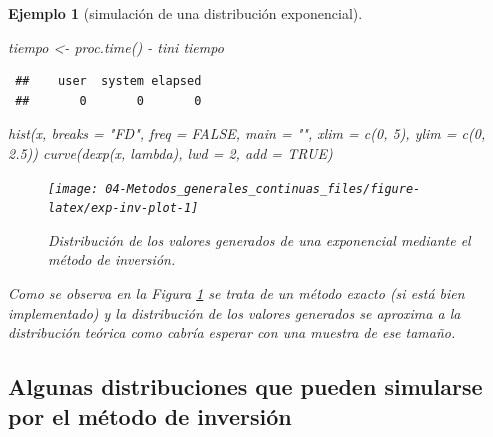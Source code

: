 \documentclass[
]{book}
\newenvironment{Shaded}{\begin{snugshade}}{\end{snugshade}}
\newcommand{\AttributeTok}[1]{\textcolor[rgb]{0.77,0.63,0.00}{#1}}
\newcommand{\ConstantTok}[1]{\textcolor[rgb]{0.00,0.00,0.00}{#1}}
\newcommand{\DecValTok}[1]{\textcolor[rgb]{0.00,0.00,0.81}{#1}}
\newcommand{\FloatTok}[1]{\textcolor[rgb]{0.00,0.00,0.81}{#1}}
\newcommand{\FunctionTok}[1]{\textcolor[rgb]{0.00,0.00,0.00}{#1}}
\newcommand{\NormalTok}[1]{#1}
\newcommand{\OtherTok}[1]{\textcolor[rgb]{0.56,0.35,0.01}{#1}}
\newcommand{\SpecialCharTok}[1]{\textcolor[rgb]{0.00,0.00,0.00}{#1}}
\newcommand{\StringTok}[1]{\textcolor[rgb]{0.31,0.60,0.02}{#1}}
\theoremstyle{break}
\newtheorem{example}{Ejemplo}[chapter]
\theoremstyle{nonumberplain}
\begin{document}
\begin{example}[simulación de una distribución exponencial]
\begin{Shaded}
\begin{Highlighting}[]
\NormalTok{tiempo }\OtherTok{\textless{}{-}} \FunctionTok{proc.time}\NormalTok{() }\SpecialCharTok{{-}}\NormalTok{ tini}
\NormalTok{tiempo}
\end{Highlighting}
\end{Shaded}

\begin{verbatim}
 ##    user  system elapsed 
 ##       0       0       0
\end{verbatim}

\begin{Shaded}
\begin{Highlighting}[]
\FunctionTok{hist}\NormalTok{(x, }\AttributeTok{breaks =} \StringTok{"FD"}\NormalTok{, }\AttributeTok{freq =} \ConstantTok{FALSE}\NormalTok{, }
        \AttributeTok{main =} \StringTok{""}\NormalTok{, }\AttributeTok{xlim =} \FunctionTok{c}\NormalTok{(}\DecValTok{0}\NormalTok{, }\DecValTok{5}\NormalTok{), }\AttributeTok{ylim =} \FunctionTok{c}\NormalTok{(}\DecValTok{0}\NormalTok{, }\FloatTok{2.5}\NormalTok{))}
\FunctionTok{curve}\NormalTok{(}\FunctionTok{dexp}\NormalTok{(x, lambda), }\AttributeTok{lwd =} \DecValTok{2}\NormalTok{, }\AttributeTok{add =} \ConstantTok{TRUE}\NormalTok{)}
\end{Highlighting}
\end{Shaded}

\begin{figure}[!htb]

{\centering \texttt{[image: 04-Metodos\_generales\_continuas\_files/figure-latex/exp-inv-plot-1]} 

}

\caption{Distribución de los valores generados de una exponencial mediante el método de inversión.}\label{fig:exp-inv-plot}
\end{figure}

Como se observa en la Figura \ref{fig:exp-inv-plot} se trata de un método exacto (si está bien implementado) y la distribución de los valores generados se aproxima a la distribución teórica como cabría esperar con una muestra de ese tamaño.
\end{example}

\hypertarget{algunas-distribuciones-que-pueden-simularse-por-el-muxe9todo-de-inversiuxf3n}{%
\subsection{Algunas distribuciones que pueden simularse por el método de inversión}\label{algunas-distribuciones-que-pueden-simularse-por-el-muxe9todo-de-inversiuxf3n}}
\end{document}
